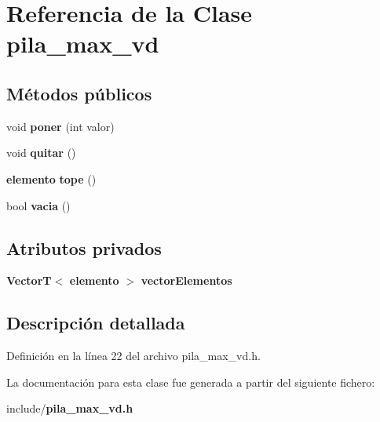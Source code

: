 \section{Referencia de la Clase pila\-\_\-max\-\_\-vd}
\label{classpila__max__vd}
\subsection*{Métodos públicos}
\begin{DoxyCompactItemize}
\item 
void {\bfseries poner} (int valor)\label{classpila__max__vd_a03c475c532e3007b2f692cfb38bd9700}

\item 
void {\bfseries quitar} ()\label{classpila__max__vd_a6bc767ea7e0e4606c081f2649c485bcc}

\item 
{\bf elemento} {\bfseries tope} ()\label{classpila__max__vd_ad340c013d8d03d9a83e6f5e8a9948978}

\item 
bool {\bfseries vacia} ()\label{classpila__max__vd_a5c6bf920400f5d42cf9ed81661cb356c}

\end{DoxyCompactItemize}
\subsection*{Atributos privados}
\begin{DoxyCompactItemize}
\item 
{\bf Vector\-T}$<$ {\bf elemento} $>$ {\bfseries vector\-Elementos}\label{classpila__max__vd_a24f653222d8bed8ac25a545b738309d4}

\end{DoxyCompactItemize}


\subsection{Descripción detallada}


Definición en la línea 22 del archivo pila\-\_\-max\-\_\-vd.\-h.



La documentación para esta clase fue generada a partir del siguiente fichero\-:\begin{DoxyCompactItemize}
\item 
include/{\bf pila\-\_\-max\-\_\-vd.\-h}\end{DoxyCompactItemize}
